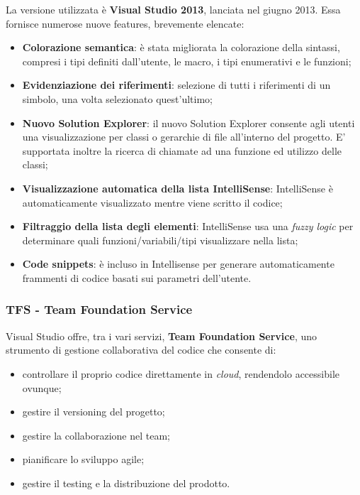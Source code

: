 La versione utilizzata è \textbf{Visual Studio 2013}, lanciata nel giugno 2013.
Essa fornisce numerose nuove features, brevemente elencate:
\begin{itemize}
\item \textbf{Colorazione semantica}: è stata migliorata la colorazione della sintassi, compresi i tipi definiti dall'utente, le macro, i tipi enumerativi e le funzioni;
\item \textbf{Evidenziazione dei riferimenti}: selezione di tutti i riferimenti di un simbolo, una volta selezionato quest'ultimo;
\item \textbf{Nuovo Solution Explorer}: il nuovo Solution Explorer consente agli utenti una visualizzazione per classi o gerarchie di file all'interno del progetto.
E' supportata inoltre la ricerca di chiamate ad una funzione ed utilizzo delle classi;
\item \textbf{Visualizzazione automatica della lista IntelliSense}: IntelliSense è automaticamente visualizzato mentre viene scritto il codice;
\item \textbf{Filtraggio della lista degli elementi}: IntelliSense usa una \textit{fuzzy logic} per determinare quali funzioni/variabili/tipi visualizzare nella lista;
\item \textbf{Code snippets}: è incluso in Intellisense per generare automaticamente frammenti di codice basati sui parametri dell'utente.
\end{itemize}

\subsubsection{TFS - Team Foundation Service}
Visual Studio offre, tra i vari servizi, \textbf{Team Foundation Service}, uno strumento di gestione collaborativa del codice che consente di:
\begin{itemize}
\item controllare il proprio codice direttamente in \textit{cloud}, rendendolo accessibile ovunque;
\item gestire il versioning del progetto;
\item gestire la collaborazione nel team;
\item pianificare lo sviluppo agile;
\item gestire il testing e la distribuzione del prodotto.
\end{itemize}

\clearpage{\pagestyle{empty}\cleardoublepage}

